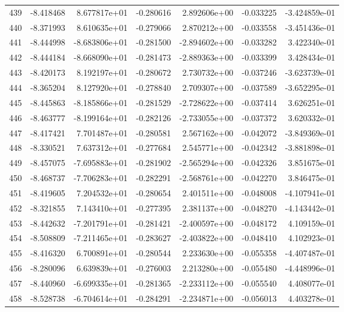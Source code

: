 \begin{tabular}{rrrrrrr}
 439 &  -8.418468 &  8.677817e+01 & -0.280616 &  2.892606e+00 &   -0.033225 & -3.424859e-01 \\
 440 &  -8.371993 &  8.610635e+01 & -0.279066 &  2.870212e+00 &   -0.033558 & -3.451436e-01 \\
 441 &  -8.444998 & -8.683806e+01 & -0.281500 & -2.894602e+00 &   -0.033282 &  3.422340e-01 \\
 442 &  -8.444184 & -8.668090e+01 & -0.281473 & -2.889363e+00 &   -0.033399 &  3.428434e-01 \\
 443 &  -8.420173 &  8.192197e+01 & -0.280672 &  2.730732e+00 &   -0.037246 & -3.623739e-01 \\
 444 &  -8.365204 &  8.127920e+01 & -0.278840 &  2.709307e+00 &   -0.037589 & -3.652295e-01 \\
 445 &  -8.445863 & -8.185866e+01 & -0.281529 & -2.728622e+00 &   -0.037414 &  3.626251e-01 \\
 446 &  -8.463777 & -8.199164e+01 & -0.282126 & -2.733055e+00 &   -0.037372 &  3.620332e-01 \\
 447 &  -8.417421 &  7.701487e+01 & -0.280581 &  2.567162e+00 &   -0.042072 & -3.849369e-01 \\
 448 &  -8.330521 &  7.637312e+01 & -0.277684 &  2.545771e+00 &   -0.042342 & -3.881898e-01 \\
 449 &  -8.457075 & -7.695883e+01 & -0.281902 & -2.565294e+00 &   -0.042326 &  3.851675e-01 \\
 450 &  -8.468737 & -7.706283e+01 & -0.282291 & -2.568761e+00 &   -0.042270 &  3.846475e-01 \\
 451 &  -8.419605 &  7.204532e+01 & -0.280654 &  2.401511e+00 &   -0.048008 & -4.107941e-01 \\
 452 &  -8.321855 &  7.143410e+01 & -0.277395 &  2.381137e+00 &   -0.048270 & -4.143442e-01 \\
 453 &  -8.442632 & -7.201791e+01 & -0.281421 & -2.400597e+00 &   -0.048172 &  4.109159e-01 \\
 454 &  -8.508809 & -7.211465e+01 & -0.283627 & -2.403822e+00 &   -0.048410 &  4.102923e-01 \\
 455 &  -8.416320 &  6.700891e+01 & -0.280544 &  2.233630e+00 &   -0.055358 & -4.407487e-01 \\
 456 &  -8.280096 &  6.639839e+01 & -0.276003 &  2.213280e+00 &   -0.055480 & -4.448996e-01 \\
 457 &  -8.440960 & -6.699335e+01 & -0.281365 & -2.233112e+00 &   -0.055540 &  4.408077e-01 \\
 458 &  -8.528738 & -6.704614e+01 & -0.284291 & -2.234871e+00 &   -0.056013 &  4.403278e-01 \\

\end{tabular}
